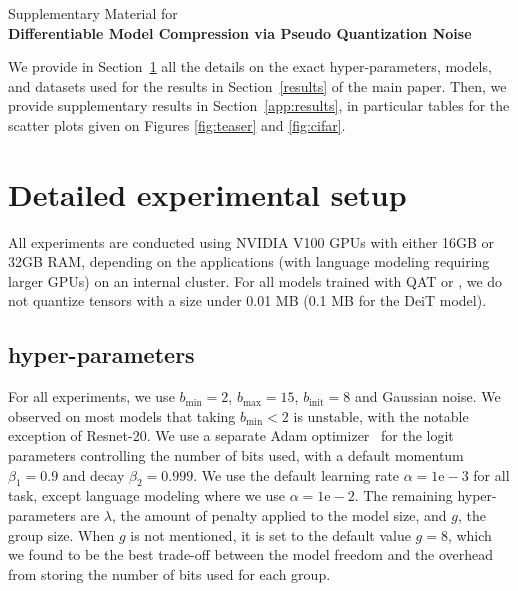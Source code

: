 \renewcommand{\thesection}{\Alph{section}}
\onecolumn
\thispagestyle{empty}
\noindent\makebox[\linewidth]{\rule{\textwidth}{1pt}}
\begin{center}\Large {} Supplementary Material for \\
\textbf{Differentiable Model Compression via Pseudo Quantization Noise}
\noindent\makebox[\linewidth]{\rule{\textwidth}{1pt}}
\end{center}
\setcounter{section}{0}
\setcounter{secnumdepth}{1}
\renewcommand\theHsection{\Alph{section}}

We provide in Section~\ref{app:xps} all the details on the 
exact hyper-parameters, models, and datasets used for the results in Section~\ref{results} of the main paper.
Then, we provide supplementary results in Section~\ref{app:results},
in particular tables for the scatter plots given on Figures \ref{fig:teaser} and \ref{fig:cifar}.

\section{Detailed experimental setup}
\label{app:xps}

All experiments are conducted using NVIDIA V100 GPUs with either 16GB or 32GB RAM, depending on the applications
(with language modeling requiring larger GPUs) on an internal cluster.
For all models trained with QAT or \diffq, we do not quantize tensors with a size under 0.01 MB (0.1 MB for the DeiT model).

\subsection{\diffq{} hyper-parameters}

For all experiments, we use $b_\textrm{min}=2$, $b_\textrm{max}=15$,
$b_\textrm{init}=8$ and Gaussian noise. 
We observed on most models that taking $b_\textrm{min} < 2$ is
unstable, with the notable exception of Resnet-20.
We use a separate Adam optimizer~\citep{adam} for the logit parameters controlling the number of bits used, with a default momentum $\beta_1=0.9$ and decay $\beta_2=0.999$.
We use the default learning rate $\alpha=1\mathrm{e}{-}3$ for all task,
except language modeling where we use $\alpha=1\mathrm{e}{-}2$.
The remaining hyper-parameters are $\lambda$, the amount of penalty
applied to the model size, and $g$, the group size. When $g$ is not mentioned, it is set to the default value $g=8$, which we found to be the best trade-off between the model freedom and the overhead from storing the number of bits used for each group. 

